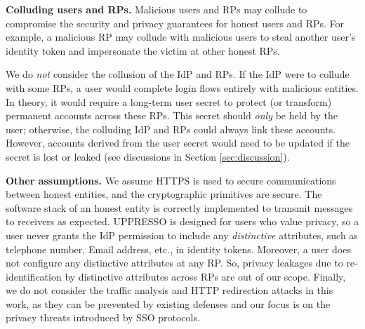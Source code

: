 \noindent \textbf{Colluding users and RPs.}
Malicious users and RPs may collude to compromise the security and privacy guarantees for honest users and RPs. For example, a malicious RP may collude with malicious users to steal another user's identity token and impersonate the victim at other honest RPs.

We do \emph{not} consider the collusion of the IdP and RPs. If the IdP were to collude with some RPs, a user would complete login flows entirely with malicious entities. In theory, it would require a long-term user secret to protect (or transform) permanent accounts across these RPs. This secret should \emph{only} be held  by the user; otherwise, the colluding IdP and RPs could always link these accounts.
However, accounts derived from the user secret would need to be updated if the secret is lost or leaked (see discussions in Section \ref{sec:discussion}).

\noindent \textbf{Other assumptions.}
We assume HTTPS is used to secure communications between honest entities, and the cryptographic primitives are secure. The software stack of an honest entity is correctly implemented to transmit messages to receivers as expected.
UPPRESSO is designed for users who value privacy,
so a user never grants the IdP permission to include any \emph{distinctive} attributes, such as telephone number, Email address, etc., in identity tokens. Moreover, a user does not configure any distinctive attributes at any RP. So, privacy leakages due to re-identification by distinctive attributes across RPs are out of our scope. Finally, we do not consider the traffic analysis and HTTP redirection attacks in this work, as they can be prevented by existing defenses and our focus is on the privacy threats introduced by SSO protocols.


